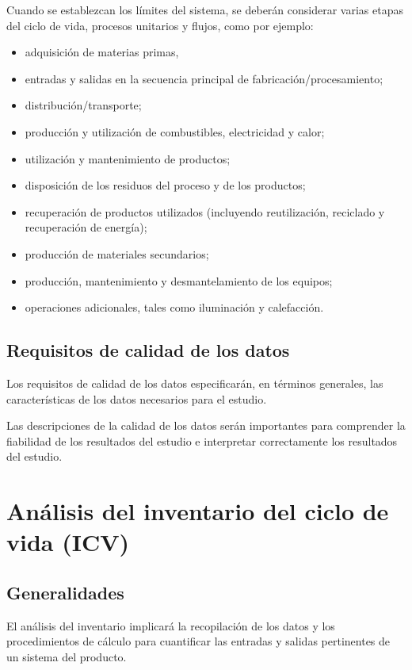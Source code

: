 Cuando se establezcan los límites del sistema, se deberán considerar varias etapas del ciclo de vida, procesos unitarios y flujos, como por ejemplo:
\begin{itemize}
  \item adquisición de materias primas,
  \item entradas y salidas en la secuencia principal de fabricación/procesamiento;
  \item distribución/transporte;
  \item producción y utilización de combustibles, electricidad y calor;
  \item utilización y mantenimiento de productos;
  \item disposición de los residuos del proceso y de los productos;
  \item recuperación de productos utilizados (incluyendo reutilización, reciclado y recuperación de energía);
  \item producción de materiales secundarios;
  \item producción, mantenimiento y desmantelamiento de los equipos;
  \item operaciones adicionales, tales como iluminación y calefacción.
\end{itemize}

\subsection{Requisitos de calidad de los datos}

Los requisitos de calidad de los datos especificarán, en términos generales, las características de los datos necesarios para el estudio.

Las descripciones de la calidad de los datos serán importantes para comprender la fiabilidad de los resultados del estudio e interpretar correctamente los resultados del estudio.

\section{Análisis del inventario del ciclo de vida (ICV)}
\subsection{Generalidades}
El análisis del inventario implicará la recopilación de los datos y los procedimientos de cálculo para cuantificar las entradas y salidas pertinentes de un sistema del producto.

